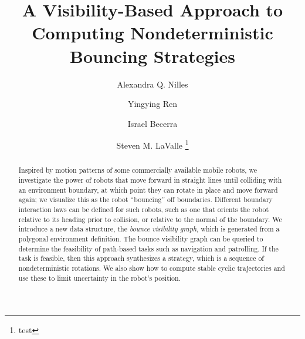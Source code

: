 \documentclass[]{styles/svproc}  %
\begin{document}
\mainmatter              %


\title{A Visibility-Based Approach to Computing Nondeterministic Bouncing
Strategies}

\author{Alexandra Q. Nilles \and Yingying Ren \and Israel
Becerra \and Steven M. LaValle%
\thanks{
{test}
}
}
\institute{}


\maketitle

\begin{abstract}
Inspired by motion patterns of some commercially available mobile robots, we
investigate the power of robots that move forward in straight lines until
colliding with an environment boundary, at which point they can rotate in place
and move forward again; we visualize this as the robot ``bouncing'' off
boundaries. Different boundary interaction laws can be defined for such robots,
such as one that orients the robot relative to its heading prior to collision,
or relative to the normal of the boundary. We introduce a new data structure,
the {\em bounce visibility graph}, which is generated from a polygonal
environment definition. The bounce visibility graph can be queried to determine
the feasibility of path-based tasks such as navigation and patrolling. If the
task is feasible, then this approach synthesizes a strategy, which is a sequence
of nondeterministic rotations. We also show how to compute stable cyclic
trajectories and use these to limit uncertainty in the robot's position.
\end{abstract}
\end{document}
